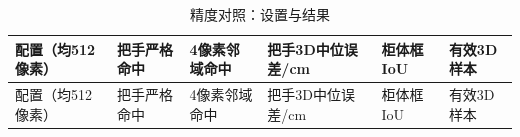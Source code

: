 \FloatBarrier\begingroup\small\setlength{\tabcolsep}{2.5pt}
\begin{longtable}[]{@{}
  >{\raggedright\arraybackslash}p{}
  >{\raggedleft\arraybackslash}p{}
  >{\raggedleft\arraybackslash}p{}
  >{\raggedleft\arraybackslash}p{}
  >{\raggedleft\arraybackslash}p{}
  >{\raggedleft\arraybackslash}p{}@{}}
\caption{精度对照：设置与结果}\label{tab:s22-1}\tabularnewline
\toprule\noalign{}
\begin{minipage}[b]{\linewidth}\raggedright
配置（均512像素）
\end{minipage} & \begin{minipage}[b]{\linewidth}\raggedleft
把手严格命中
\end{minipage} & \begin{minipage}[b]{\linewidth}\raggedleft
4像素邻域命中
\end{minipage} & \begin{minipage}[b]{\linewidth}\raggedleft
把手3D中位误差/cm
\end{minipage} & \begin{minipage}[b]{\linewidth}\raggedleft
柜体框IoU
\end{minipage} & \begin{minipage}[b]{\linewidth}\raggedleft
有效3D样本
\end{minipage} \\
\midrule\noalign{}
\endfirsthead
\toprule\noalign{}
\begin{minipage}[b]{\linewidth}\raggedright
配置（均512像素）
\end{minipage} & \begin{minipage}[b]{\linewidth}\raggedleft
把手严格命中
\end{minipage} & \begin{minipage}[b]{\linewidth}\raggedleft
4像素邻域命中
\end{minipage} & \begin{minipage}[b]{\linewidth}\raggedleft
把手3D中位误差/cm
\end{minipage} & \begin{minipage}[b]{\linewidth}\raggedleft
柜体框IoU
\end{minipage} & \begin{minipage}[b]{\linewidth}\raggedleft
有效3D样本
\end{minipage} \\

\end{longtable}
